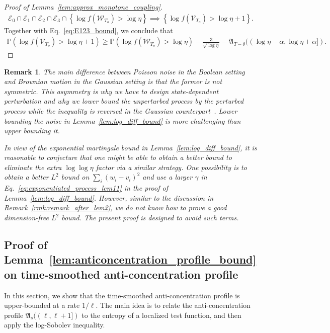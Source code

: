 \documentclass[11pt]{article}
\newcommand{\excess}{\alpha}
\newcommand{\fA}{\mathfrak{A}}
\newcommand{\To}{{T_o}}
\newcommand{\rV}{\mathscr{V}}
\newcommand{\rW}{\mathscr{W}}
\newcommand{\cE}{\mathscr{E}}
\theoremstyle{named}
\theoremstyle{plain}
\newtheorem{remark}{Remark}
\newcommand{\Prob}{\ensuremath{{\mathbb{P}}}}
\newcommand{\parenth}[1]{\left( #1 \right)}
\newcommand{\braces}[1]{\left\{ #1 \right \}}
\begin{document}
\begin{proof}[Proof of Lemma~\ref{lem:approx_monotone_coupling}]
\begin{align*}
  \cE_0 \cap \cE_1 \cap \cE_2 \cap \cE_3 \cap \braces{\log f(\rW_\To) > \log \eta} \implies
  \braces{\log f(\rV_\To) > \log \eta + 1}. 
\end{align*}
Together with Eq.~\eqref{eq:E123_bound}, we conclude that
\begin{align*}
  \Prob\parenth{\log f(\rV_\To) > \log \eta + 1}
    \geq \Prob\parenth{\log f(\rW_\To) > \log \eta} - \frac{3}{\sqrt{\log \eta}} - \fA_{T-\theta}((\log \eta - \excess, \log \eta + \excess]).
\end{align*}
\end{proof}

\begin{remark}
  The main difference between Poisson noise in the Boolean setting and Brownian motion in the Gaussian setting is that the former is not symmetric. This asymmetry is why we have to design state-dependent perturbation and why we lower bound the unperturbed process by the perturbed process while the inequality is reversed in the Gaussian counterpart~\cite{eldan2018regularization}. Lower bounding the noise in Lemma~\ref{lem:log_diff_bound} is more challenging than upper bounding it. 

  In view of the exponential martingale bound in Lemma~\ref{lem:log_diff_bound}, it is reasonable to conjecture that one might be able to obtain a better bound to eliminate the extra $\log\log\eta$ factor via a similar strategy. One possibility is to obtain a better $L^2$ bound on $\sum_{i} (w_i - v_i)^2$ and use a larger $\gamma$ in Eq.~\eqref{eq:exponentiated_process_lem11} in the proof of Lemma~\ref{lem:log_diff_bound}. However, similar to the discussion in Remark~\ref{rmk:remark_after_lem2}, we do not know how to prove a good dimension-free $L^2$ bound. The present proof is designed to avoid such terms.
\end{remark}

\subsection{Proof of Lemma~\ref{lem:anticoncentration_profile_bound} on time-smoothed anti-concentration profile}
\label{sub:time_smoothed_anti_concentration_profile_bound}
In this section, we show that the time-smoothed anti-concentration profile is upper-bounded at a rate $1/\ell$. 
The main idea is to relate the anti-concentration profile $\fA_{s}((\ell, \ell+1])$ to the entropy of a localized test function, and then apply the log-Sobolev inequality.
\end{document}
